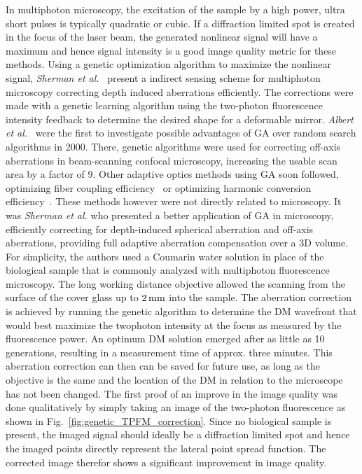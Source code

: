 In multiphoton microscopy, the excitation of the sample by a high power, ultra short pulses is typically quadratic or cubic. If a diffraction limited spot is created in the focus of the laser beam, the generated nonlinear signal will have a maximum and hence signal intensity is a good image quality metric for these methods. Using a genetic optimization algorithm to maximize the nonlinear signal, \emph{Sherman et al.}~\cite{Genetic_MPFM} present a indirect sensing scheme for multiphoton microscopy correcting depth induced aberrations efficiently. The corrections were made with a genetic learning algorithm using the two-photon fluorescence intensity feedback to determine the desired shape for a deformable mirror. \emph{Albert et al.}~\cite{Genetic_smart_algorithm} were the first to investigate possible advantages of GA over random search algorithms in 2000. There, genetic algorithms were used for correcting off-axis aberrations in beam-scanning confocal microscopy, increasing the usable scan area by a factor of 9. Other adaptive optics methods using GA soon followed, optimizing fiber coupling efficiency~\cite{Genetic_fiber_coupling} or optimizing harmonic conversion efficiency~\cite{Genetic_Harmonic_optimization}. These methods however were not directly related to microscopy. It was \emph{Sherman et al.} who presented a better application of GA in microscopy, efficiently correcting for depth-induced spherical aberration and off-axis aberrations, providing full adaptive aberration compensation over a 3D volume. For simplicity, the authors used a Coumarin water solution in place of the biological sample that is commonly analyzed with multiphoton fluorescence microscopy. The long working distance objective allowed the scanning from the surface of the cover glass up to $\unit[2]{mm}$ into the sample. The aberration correction is achieved by running the genetic algorithm to determine the DM wavefront that would best maximize the twophoton intensity at the focus as measured by the fluorescence power. An optimum DM solution emerged after as little as 10 generations, resulting in a measurement time of approx. three minutes. This aberration correction can then can be saved for future use, as long as the objective is the same and the location of the DM in relation to the microscope has not been changed. The first proof of an improve in the image quality was done qualitatively by simply taking an image of the two-photon fluorescence as shown in Fig.~\ref{fig:genetic_TPFM_correction}. Since no biological sample is present, the imaged signal should ideally be a diffraction limited spot and hence the imaged points directly represent the lateral point spread function. The corrected image therefor shows a significant improvement in image quality.

